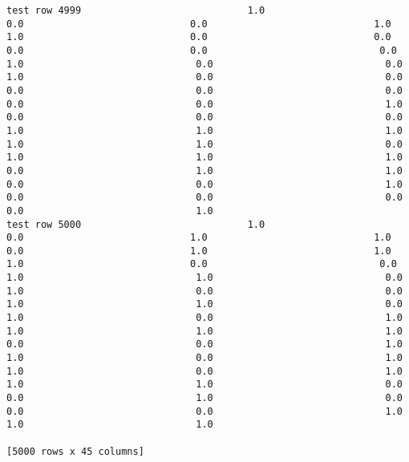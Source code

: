 \documentclass[11pt]{article}
\begin{document}
\begin{verbatim}
test row 4999                             1.0                             0.0                             0.0                             1.0                             1.0                             0.0                             0.0                             0.0                             0.0                              0.0                              1.0                              0.0                              0.0                              1.0                              0.0                              0.0                              0.0                              0.0                              0.0                              0.0                              0.0                              1.0                              0.0                              0.0                              0.0                              1.0                              1.0                              1.0                              1.0                              1.0                              0.0                              1.0                              1.0                              1.0                              0.0                              1.0                              1.0                              0.0                              0.0                              1.0                              0.0                              0.0                              0.0                              0.0                              1.0
test row 5000                             1.0                             0.0                             1.0                             1.0                             0.0                             1.0                             1.0                             1.0                             0.0                              0.0                              1.0                              1.0                              0.0                              1.0                              0.0                              0.0                              1.0                              1.0                              0.0                              1.0                              0.0                              1.0                              1.0                              1.0                              1.0                              0.0                              0.0                              1.0                              1.0                              0.0                              1.0                              1.0                              0.0                              1.0                              1.0                              1.0                              0.0                              0.0                              1.0                              0.0                              0.0                              0.0                              1.0                              1.0                              1.0

[5000 rows x 45 columns]
    \end{verbatim}
\end{document}
